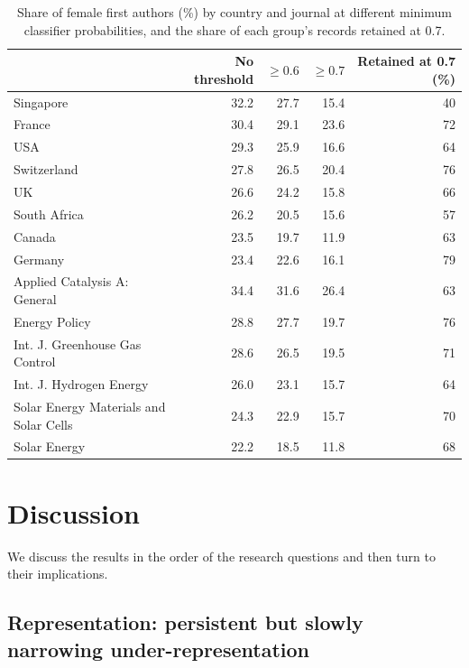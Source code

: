 \documentclass[preprint,12pt,number]{elsarticle}
\begin{document}
\begin{table}[htbp]
\centering
\caption{Share of female first authors (\%) by country and journal at different minimum classifier probabilities, and the share of each group's records retained at 0.7.}
\label{tab:threshold}
\begin{tabular}{lrrrr}
\toprule
 & No threshold & $\geq 0.6$ & $\geq 0.7$ & Retained at 0.7 (\%) \\
\midrule
Singapore    & 32.2 & 27.7 & 15.4 & 40 \\
France       & 30.4 & 29.1 & 23.6 & 72 \\
USA          & 29.3 & 25.9 & 16.6 & 64 \\
Switzerland  & 27.8 & 26.5 & 20.4 & 76 \\
UK           & 26.6 & 24.2 & 15.8 & 66 \\
South Africa & 26.2 & 20.5 & 15.6 & 57 \\
Canada       & 23.5 & 19.7 & 11.9 & 63 \\
Germany      & 23.4 & 22.6 & 16.1 & 79 \\
\midrule
Applied Catalysis A: General & 34.4 & 31.6 & 26.4 & 63 \\
Energy Policy & 28.8 & 27.7 & 19.7 & 76 \\
Int. J. Greenhouse Gas Control & 28.6 & 26.5 & 19.5 & 71 \\
Int. J. Hydrogen Energy & 26.0 & 23.1 & 15.7 & 64 \\
Solar Energy Materials and Solar Cells & 24.3 & 22.9 & 15.7 & 70 \\
Solar Energy & 22.2 & 18.5 & 11.8 & 68 \\
\bottomrule
\end{tabular}
\end{table}

\section{Discussion}

We discuss the results in the order of the research questions and then turn to their implications.

\subsection{Representation: persistent but slowly narrowing under-representation}
\end{document}
